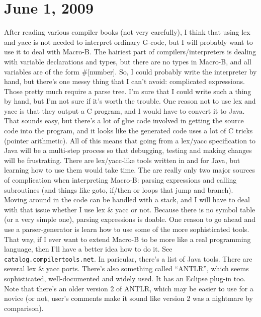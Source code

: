 \documentclass[titlepage,oneside,10pt]{article}
\begin{document}
\section{June 1, 2009}

After reading various compiler books (not very carefully), I think
that using lex and yacc is not needed to interpret ordinary G-code,
but I will probably want to use it to deal with Macro-B. The hairiest
part of compilers/interpreters is dealing with variable declarations
and types, but there are no types in Macro-B, and all variables are of
the form \#[number]. So, I could probably write the interpreter by
hand, but there's one messy thing that I can't avoid: complicated
expressions. Those pretty much require a parse tree. I'm sure that I
could write such a thing by hand, but I'm not sure if it's worth the
trouble. One reason not to use lex and yacc is that they output a C
program, and I would have to convert it to Java. That sounds easy, but
there's a lot of glue code involved in getting the source code into
the program, and it looks like the generated code uses a lot of C
tricks (pointer arithmetic). All of this means that going from
a lex/yacc specification to Java will be a multi-step process so that
debugging, testing and making changes will be frustrating. There
are lex/yacc-like tools written in and for Java, but learning how to
use them would take time. The are really only two major sources of
complication when interpreting Macro-B: parsing expressions and
calling subroutines (and things like goto, if/then or loops that jump
and branch). Moving around in the code can be handled with a stack,
and I will have to deal with that issue whether I use lex \& yacc or
not. Because there is no symbol table (or a very simple one), parsing
expressions is doable. One reason to go ahead and use a
parser-generator is learn how to use some of the more sophisticated
tools. That way, if I ever want to extend Macro-B to be more like a
real programming language, then I'll have a
better idea how to do it. See {\tt catalog.compilertools.net}. In
paricular, there's a list of Java tools. There are several lex \& yacc
ports. There's also something called ``ANTLR'', which seems
sophisticated, well-documented and widely used. It has an Eclipse
plug-in too. Note that there's an older version 2 of ANTLR, which may
be easier to use for a novice (or not, user's comments make it sound
like version 2 was a nightmare by comparison).
\end{document}
